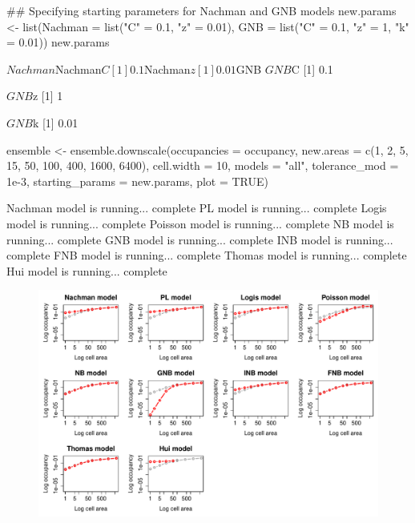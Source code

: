 \documentclass{article}[12pt, a4paper]
\begin{document}
\begin{Schunk}
\begin{Sinput}
## Specifying starting parameters for Nachman and GNB models
new.params <- list(Nachman = list("C" = 0.1, "z" = 0.01),
                   GNB = list("C" = 0.1, "z" = 1, "k" = 0.01))
new.params
\end{Sinput}
\begin{Soutput}
$Nachman
$Nachman$C
[1] 0.1

$Nachman$z
[1] 0.01


$GNB
$GNB$C
[1] 0.1

$GNB$z
[1] 1

$GNB$k
[1] 0.01


\end{Soutput}
\end{Schunk}

\begin{Schunk}
\begin{Sinput}
ensemble <- ensemble.downscale(occupancies = occupancy,
                               new.areas = c(1, 2, 5, 15, 50, 100, 400, 1600,
                                             6400),
                               cell.width = 10,
                               models = "all",
                               tolerance_mod = 1e-3,
                               starting_params = new.params,
                               plot = TRUE)
\end{Sinput}
\begin{Soutput}
Nachman model is running...  complete 
PL model is running...  complete 
Logis model is running...  complete 
Poisson model is running...  complete 
NB model is running...  complete 
GNB model is running...  complete 
INB model is running...  complete 
FNB model is running...  complete 
Thomas model is running...  complete 
Hui model is running...  complete 

\end{Soutput}
\end{Schunk}

\begin{figure}[!ht]
\centering
\includegraphics[width=\linewidth]{Downscaling-downscale26}
\end{figure}
\end{document}
